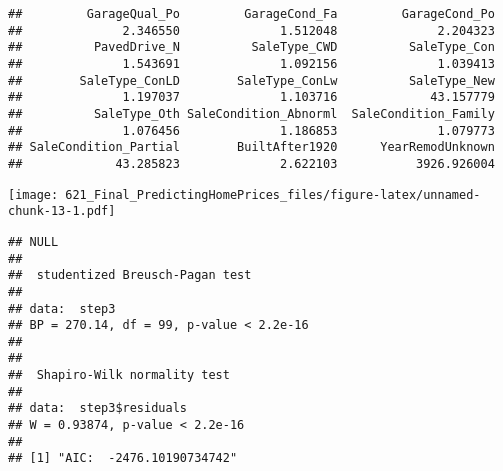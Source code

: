 \documentclass[
]{article}
\begin{document}
\begin{verbatim}
##         GarageQual_Po         GarageCond_Fa         GarageCond_Po 
##              2.346550              1.512048              2.204323 
##          PavedDrive_N          SaleType_CWD          SaleType_Con 
##              1.543691              1.092156              1.039413 
##        SaleType_ConLD        SaleType_ConLw          SaleType_New 
##              1.197037              1.103716             43.157779 
##          SaleType_Oth SaleCondition_Abnorml  SaleCondition_Family 
##              1.076456              1.186853              1.079773 
## SaleCondition_Partial        BuiltAfter1920      YearRemodUnknown 
##             43.285823              2.622103           3926.926004
\end{verbatim}

\texttt{[image: 621\_Final\_PredictingHomePrices\_files/figure-latex/unnamed-chunk-13-1.pdf]}

\begin{verbatim}
## NULL
## 
##  studentized Breusch-Pagan test
## 
## data:  step3
## BP = 270.14, df = 99, p-value < 2.2e-16
## 
## 
##  Shapiro-Wilk normality test
## 
## data:  step3$residuals
## W = 0.93874, p-value < 2.2e-16
## 
## [1] "AIC:  -2476.10190734742"
\end{verbatim}
\end{document}
